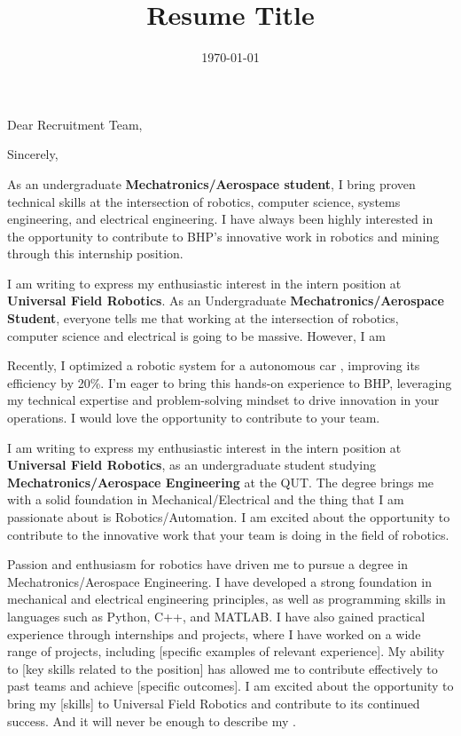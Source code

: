 \documentclass[11pt,a4paper,sans]{moderncv}        %
\title{Resume Title}                               %
\begin{document}
\date{\today}
\opening{Dear Recruitment Team,}
\closing{Sincerely,}
\makelettertitle

As an undergraduate \textbf{Mechatronics/Aerospace student},
 I bring proven technical skills at the intersection of robotics, computer science, systems engineering,
 and electrical engineering. I have always been highly interested in the opportunity to contribute to BHP’s 
 innovative work in robotics and mining through this internship position.

I am writing to express my enthusiastic interest in the intern position at \textbf{Universal Field Robotics}. As an Undergraduate \textbf{Mechatronics/Aerospace Student}, everyone tells me that working at 
the intersection of robotics, computer science and electrical is going to be massive. However, I am 


Recently, I optimized a robotic system for a autonomous car
, improving its efficiency by 20\%. 
I’m eager to bring this hands-on experience to BHP, leveraging my technical expertise and 
problem-solving mindset to drive innovation in your operations. 
I would love the opportunity to contribute to your team.


I am writing to express my enthusiastic interest in the intern position at \textbf{Universal Field Robotics}, 
as an undergraduate student studying \textbf{Mechatronics/Aerospace Engineering} at the QUT. The degree brings me with a solid foundation in Mechanical/Electrical 
and the thing that I am passionate about is Robotics/Automation. I am excited about the opportunity to contribute to the innovative work that your team is doing in the field of robotics.

Passion and enthusiasm for robotics have driven me to pursue a degree in Mechatronics/Aerospace Engineering. I have developed a strong foundation in mechanical and electrical engineering principles, as well as programming skills in languages such as Python, C++, and MATLAB. I have also gained practical experience through internships and projects, where I have worked on a wide range of projects, including [specific examples of relevant experience]. My ability to [key skills related to the position] has allowed me to contribute effectively to past teams and achieve [specific outcomes]. I am excited about the opportunity to bring my [skills] to Universal Field Robotics and contribute to its continued success. 
And it will never be enough to describe my .
\end{document}
